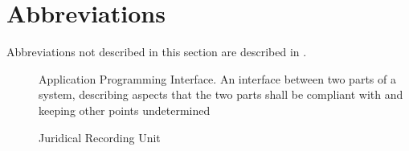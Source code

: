 \section{Abbreviations}

Abbreviations not described in this section are described in
\cite{subset-023}.

\begin{description}
\item[] Application Programming Interface. An interface
  between two parts of a system, describing aspects that the two parts
  shall be compliant with and keeping other points undetermined
\item [] Juridical Recording Unit
\end{description}

